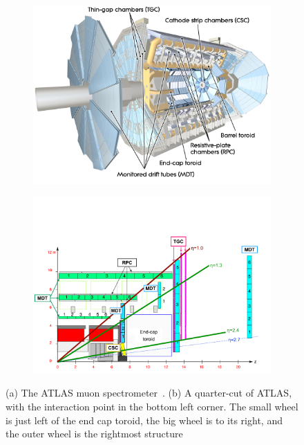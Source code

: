 \begin{figure}
\centering
\begin{subfigure}{.5\textwidth}
  \centering
  \includegraphics[width=\linewidth]{figures/atlas_muon_spectrometer.jpg}
  \caption{}
  \label{fig:atlas_muon_spectrometer_3D}
\end{subfigure}%
\begin{subfigure}{.5\textwidth}
  \centering
  \includegraphics[width=\linewidth]{figures/atlas_old_muon_spec_quarter_cut_recolour.png}
  \caption{}
  \label{fig:atlas_muon_spectrometer_cut}
\end{subfigure}
\caption{(a) The ATLAS muon spectrometer~\cite{collaboration_atlas_2008}. (b) A quarter-cut of ATLAS, with the interaction point in the bottom left corner. The small wheel is just left of the end cap toroid, the big wheel is to its right, and the outer wheel is the rightmost structure~\cite{atlas_performance_muon_trigger_2015}}
\label{fig:atlas_muon_spectrometer}
\end{figure}

